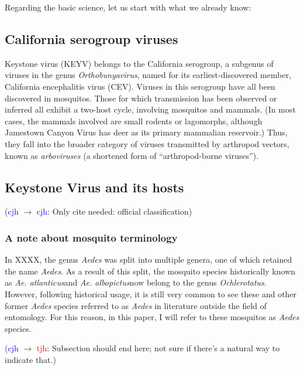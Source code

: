\documentclass[12pt]{article}
\newcommand{\alb}{\textit{Ae. albopictus}}
\newcommand{\atl}{\textit{Ae. atlanticus}}
\newcommand{\cjh}{\textcolor{blue}{cjh}}
\newcommand{\tjh}{\textcolor{red}{tjh}}
\newcommand{\msg}[3]{(#1 $\rightarrow$ #2: #3)}
\newcommand{\mcc}[1]{\msg\cjh\cjh{#1}}
\newcommand{\mct}[1]{\msg\cjh\tjh{#1}}
\begin{document}
        Regarding the basic science, let us start with what we already know:

        \subsection{California serogroup viruses}
            \label{california-serogroup}
            Keystone virus (KEYV) belongs to the California serogroup, a subgenus of viruses in the genus \textit{Orthobunyavirus}, named for its earliest-discovered member, California encephalitis virus (CEV). Viruses in this serogroup have all been discovered in mosquitos. Those for which transmission has been observed or inferred all exhibit a two-host cycle, involving mosquitos and mammals. (In most cases, the mammals involved are small rodents or lagomorphs, although Jamestown Canyon Virus has deer as its primary mammalian reservoir.) Thus, they fall into the broader category of viruses transmitted by arthropod vectors, known as \textit{arboviruses} (a shortened form of ``arthropod-borne viruses'').
        
        \subsection{Keystone Virus and its hosts}
            \label{california-keystone}
            \mcc{Only cite needed: official classification}
            \subsubsection{A note about mosquito terminology}
                \label{mosquito-terminology}
                In XXXX, the genus \textit{Aedes} was split into multiple genera, one of which retained the name \textit{Aedes}. As a result of this split, the mosquito species historically known as \atl and \alb now belong to the genus \textit{Ochlerotatus}. However, following historical usage, it is still very common to see these and other former \textit{Aedes} species referred to as \textit{Aedes} in literature outside the field of entomology. For this reason, in this paper, I will refer to these mosquitos as \textit{Aedes} species.

            \mct{Subsection should end here; not sure if there's a natural way to indicate that.}
\end{document}
